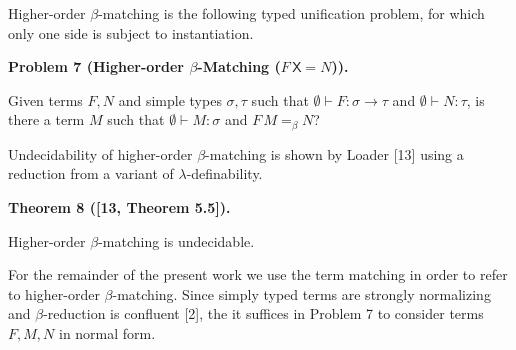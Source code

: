 \documentclass[10pt,a4paper]{amsart}
\begin{document}
 
 
Higher-order $\beta$-matching is the following typed unification problem, for which only one side is subject to instantiation.\par
 
 
 
\par\medskip\noindent\textbf{Problem 7 (Higher-order $\beta$-Matching (${F}\,\mathsf{X}=N$)).}\par
 
 
Given terms $F,N$ and simple types $\sigma,\tau$ such that $\emptyset\vdash F:\sigma\to\tau$ and $\emptyset\vdash N:\tau$, is there a term $M$ such that $\emptyset\vdash M:\sigma$ and $F\,M=_{\beta}N$?\par
 
 
 
 
Undecidability of higher-order $\beta$-matching is shown by Loader [13] using a reduction from a variant of $\lambda$-definability.\par
 
 
 
\par\medskip\noindent\textbf{Theorem 8 ([13, Theorem 5.5]).}\par
 
 
Higher-order $\beta$-matching is undecidable.\par
 
 
 
 
For the remainder of the present work we use the term matching in order to refer to higher-order $\beta$-matching. Since simply typed terms are strongly normalizing and $\beta$-reduction is confluent [2], the it suffices in Problem 7 to consider terms $F,M,N$ in normal form.\par
 
 
 
\end{document}
